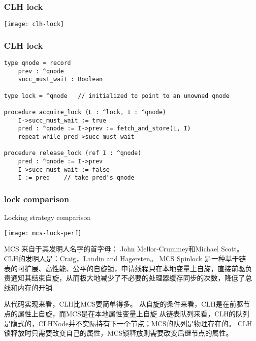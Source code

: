 \begin{frame}[fragile]
    \frametitle{CLH lock}
    \centering
    \texttt{[image: clh-lock]}
\end{frame}
\begin{frame}[fragile]
    \frametitle{CLH lock}    
    \begin{block}{}
        \begin{verbatim}
type qnode = record
    prev : ^qnode
    succ_must_wait : Boolean
    
type lock = ^qnode   // initialized to point to an unowned qnode

procedure acquire_lock (L : ^lock, I : ^qnode)
    I->succ_must_wait := true
    pred : ^qnode := I->prev := fetch_and_store(L, I)
    repeat while pred->succ_must_wait

procedure release_lock (ref I : ^qnode)
    pred : ^qnode := I->prev
    I->succ_must_wait := false
    I := pred    // take pred's qnode
 \end{verbatim}
    \end{block}         
    
\end{frame}

\begin{frame}[fragile]
    \frametitle{lock comparison}
    \centering
    Locking strategy comparison
    
    \texttt{[image: mcs-lock-perf]}
\end{frame}


MCS 来自于其发明人名字的首字母： John Mellor-Crummey和Michael Scott。
CLH的发明人是：Craig，Landin and Hagersten。
MCS Spinlock 是一种基于链表的可扩展、高性能、公平的自旋锁，申请线程只在本地变量上自旋，直接前驱负责通知其结束自旋，从而极大地减少了不必要的处理器缓存同步的次数，降低了总线和内存的开销

从代码实现来看，CLH比MCS要简单得多。
从自旋的条件来看，CLH是在前驱节点的属性上自旋，而MCS是在本地属性变量上自旋
从链表队列来看，CLH的队列是隐式的，CLHNode并不实际持有下一个节点；MCS的队列是物理存在的。
CLH锁释放时只需要改变自己的属性，MCS锁释放则需要改变后继节点的属性。

